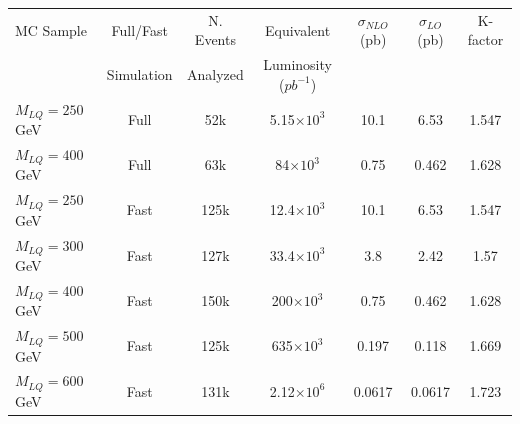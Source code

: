 \documentclass{cmspaper}
\begin{document}
\begin{linenumbers}
\begin{table}[htb]
  \label{tab:NumEvents}
  \begin{center}
    \begin{tabular}{|l|cccccc|} \hline\hline
      MC Sample                   & Full/Fast & N. Events & Equivalent             & $\sigma_{NLO}$ (pb) & $\sigma_{LO}$ (pb) & K-factor \\
                                  & Simulation& Analyzed  & Luminosity ($pb^{-1}$)        &                     &                    &    \\ 
\hline\hline
      $M_{LQ}=250~$GeV            & Full      & 52k       &    5.15$\times 10^3$   & 10.1                & 6.53               & 1.547\\
      $M_{LQ}=400~$GeV            & Full      & 63k       &      84$\times 10^3$   &  0.75		 & 0.462	      & 1.628\\ 
\hline
      $M_{LQ}=250~$GeV            & Fast      & 125k      &    12.4$\times 10^3$   & 10.1		 & 6.53		      & 1.547\\
      $M_{LQ}=300~$GeV            & Fast      & 127k      &    33.4$\times 10^3$   &  3.8	         & 2.42		      & 1.57\\
      $M_{LQ}=400~$GeV            & Fast      & 150k      &     200$\times 10^3$   &  0.75	         & 0.462	      & 1.628\\
      $M_{LQ}=500~$GeV            & Fast      & 125k      &     635$\times 10^3$   &  0.197  	         & 0.118	      & 1.669\\
      $M_{LQ}=600~$GeV            & Fast      & 131k      &    2.12$\times 10^6$   &  0.0617             & 0.0617             & 1.723\\

\end{tabular}
\end{center}
\end{table}
\end{linenumbers}
\end{document}
